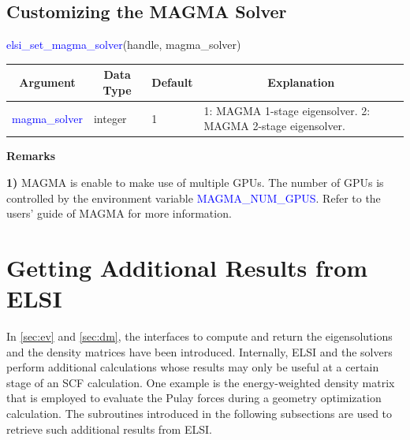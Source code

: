 \documentclass{report}
\begin{document}
\subsection{Customizing the MAGMA Solver}
\label{subsec:setter_magma}
\begin{labeling}{\hspace{6cm}}
\item [\hspace{0.3cm} \textcolor{blue}{elsi\_set\_magma\_solver}(handle, magma\_solver)]
\end{labeling}

\begin{tabular}[]{|p{30mm}|p{20mm}|p{15mm}|p{100mm}|}
\hline
\multicolumn{1}{|c|}{\textbf{Argument}} & \multicolumn{1}{c|}{\textbf{Data Type}} & \multicolumn{1}{c|}{\textbf{Default}} & \multicolumn{1}{c|}{\textbf{Explanation}}\\
\hline
\textcolor{blue}{magma\_solver} & integer & 1 & 1: MAGMA 1-stage eigensolver. 2: MAGMA 2-stage eigensolver.\\
\hline
\end{tabular}

\textbf{Remarks}

\textbf{1)} MAGMA is enable to make use of multiple GPUs. The number of GPUs is controlled by the environment variable \textcolor{blue}{MAGMA\_NUM\_GPUS}. Refer to the users' guide of MAGMA for more information.

\section{Getting Additional Results from ELSI}
\label{sec:getter}
In \ref{sec:ev} and \ref{sec:dm}, the interfaces to compute and return the eigensolutions and the density matrices have been introduced. Internally, ELSI and the solvers perform additional calculations whose results may only be useful at a certain stage of an SCF calculation. One example is the energy-weighted density matrix that is employed to evaluate the Pulay forces during a geometry optimization calculation. The subroutines introduced in the following subsections are used to retrieve such additional results from ELSI.
\end{document}
